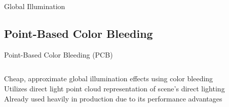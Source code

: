 \documentclass[10pt,compress,professionalfont]{beamer}
\begin{document}
\begin{frame}{Global Illumination}
\end{frame}




\subsection{Point-Based Color Bleeding}
\begin{frame}{Point-Based Color Bleeding (PCB)}


    \begin{columns}
        \begin{column}{0.65\textwidth}
            Cheap, approximate global illumination effects using color bleeding\\
            \vspace{8mm}
            Utilizes direct light point cloud representation of scene's direct lighting\\
            \vspace{8mm}
            Already used heavily in production due to its performance advantages


\end{column}
\end{columns}
\end{frame}
\end{document}
